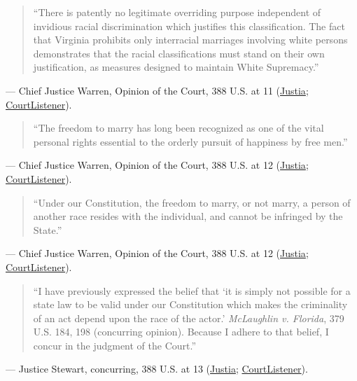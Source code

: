 \documentclass[12pt]{article}
\begin{document}
\begin{quote}
``There is patently no legitimate overriding purpose independent of invidious racial discrimination which justifies this classification. The fact that Virginia prohibits only interracial marriages involving white persons demonstrates that the racial classifications must stand on their own justification, as measures designed to maintain White Supremacy.''
\end{quote}
\noindent --- Chief Justice Warren, Opinion of the Court, 388 U.S. at 11 (\href{https://supreme.justia.com/cases/federal/us/388/1/}{Justia}; \href{https://www.courtlistener.com/opinion/107480/loving-v-virginia/}{CourtListener}).

\begin{quote}
``The freedom to marry has long been recognized as one of the vital personal rights essential to the orderly pursuit of happiness by free men.''
\end{quote}
\noindent --- Chief Justice Warren, Opinion of the Court, 388 U.S. at 12 (\href{https://supreme.justia.com/cases/federal/us/388/1/}{Justia}; \href{https://www.courtlistener.com/opinion/107480/loving-v-virginia/}{CourtListener}).

\begin{quote}
``Under our Constitution, the freedom to marry, or not marry, a person of another race resides with the individual, and cannot be infringed by the State.''
\end{quote}
\noindent --- Chief Justice Warren, Opinion of the Court, 388 U.S. at 12 (\href{https://supreme.justia.com/cases/federal/us/388/1/}{Justia}; \href{https://www.courtlistener.com/opinion/107480/loving-v-virginia/}{CourtListener}).

\begin{quote}
``I have previously expressed the belief that `it is simply not possible for a state law to be valid under our Constitution which makes the criminality of an act depend upon the race of the actor.' \textit{McLaughlin v. Florida}, 379 U.S. 184, 198 (concurring opinion). Because I adhere to that belief, I concur in the judgment of the Court.''
\end{quote}
\noindent --- Justice Stewart, concurring, 388 U.S. at 13 (\href{https://supreme.justia.com/cases/federal/us/388/1/}{Justia}; \href{https://www.courtlistener.com/opinion/107480/loving-v-virginia/}{CourtListener}).
\end{document}
